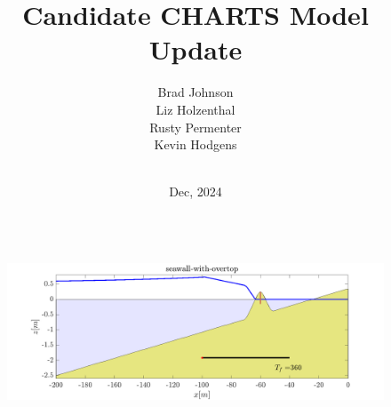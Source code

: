 \documentclass[aspectratio=169]{beamer}
\title[CHARTS]{Candidate CHARTS Model Update} %
\author[]{Brad Johnson\\Liz Holzenthal\\Rusty Permenter \\Kevin Hodgens } %
\institute[ERDC] %
{USACE Engineering Research and Development Center \\ %
\medskip
\textit{} %
}
\date{\vspace*{-0cm}\\ Dec, 2024} %
\begin{document}
\begin{frame}
  \begin{columns}[c] %
    
    \titlepage %
    \begin{figure}
            \includegraphics[width=1\linewidth]{../../graphics/seawall_with_overtop.png}
    \end{figure}
    
  \end{columns}
\end{frame}
\end{document}

